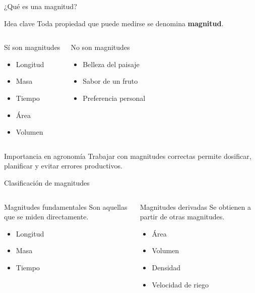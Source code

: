 \documentclass[aspectratio=169,10pt]{beamer}
\newcommand{\idea}[1]{
	\begin{block}{Idea clave}
		#1
	\end{block}
}
\begin{document}
	\begin{frame}{¿Qué es una magnitud?}
		\idea{Toda propiedad que puede medirse se denomina \textbf{magnitud}.}
		
		\begin{columns}[T]
			\begin{block}{Sí son magnitudes}
				\begin{itemize}[<+->]
					\item Longitud
					\item Masa
					\item Tiempo
					\item Área
					\item Volumen
				\end{itemize}
			\end{block}
			
			\begin{alertblock}{No son magnitudes}
				\begin{itemize}[<+->]
					\item Belleza del paisaje
					\item Sabor de un fruto
					\item Preferencia personal
				\end{itemize}
			\end{alertblock}
		\end{columns}
		
		\pause
		\begin{block}{Importancia en agronomía}
			Trabajar con magnitudes correctas permite dosificar, planificar y evitar errores productivos.
		\end{block}
	\end{frame}
	
	\begin{frame}{Clasificación de magnitudes}
		\begin{columns}[T]
			\begin{block}{Magnitudes fundamentales}
				Son aquellas que se miden directamente.
				\begin{itemize}[<+->]
					\item Longitud
					\item Masa
					\item Tiempo
				\end{itemize}
			\end{block}
			
			\begin{block}{Magnitudes derivadas}
				Se obtienen a partir de otras magnitudes.
				\begin{itemize}[<+->]
					\item Área
					\item Volumen
					\item Densidad
					\item Velocidad de riego
				\end{itemize}
			\end{block}
		\end{columns}
	\end{frame}
	
\end{document}
